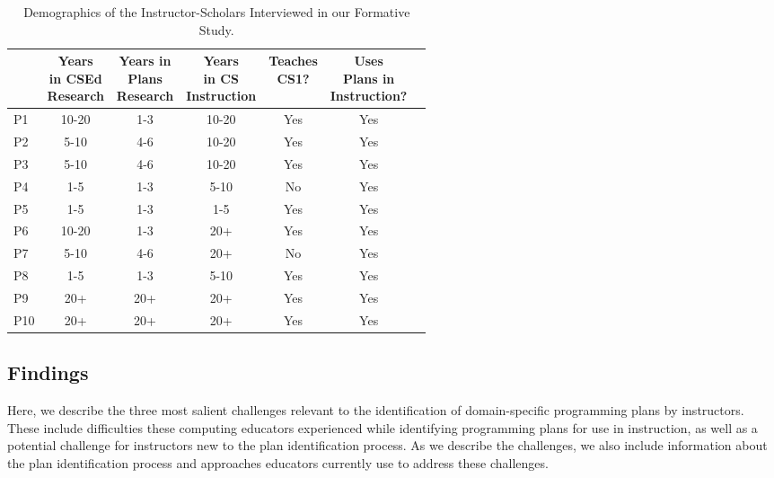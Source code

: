 \begin{table}[h]
\caption{Demographics of the Instructor-Scholars Interviewed in our Formative Study.}
    \centering
    \footnotesize
    \label{tab:formative-participants}
    \begin{tabular}{l|cccccc}
    \toprule
            & \shortstack{Years \\ in CSEd \\ Research} & \shortstack{Years in \\ Plans \\ Research} & \shortstack{Years \\ in CS \\ Instruction} & \shortstack{Teaches \\ CS1?} & \shortstack{Uses \\ Plans in \\ Instruction?}
    \\\midrule
        P1 & 10-20 & 1-3 & 10-20 & Yes  & Yes \\
        P2 & 5-10 & 4-6 & 10-20 & Yes  & Yes \\ 
        P3 & 5-10 & 4-6 & 10-20 & Yes  & Yes \\ 
        P4 & 1-5 & 1-3 & 5-10 & No  & Yes \\ 
        P5 & 1-5 & 1-3 & 1-5 & Yes  & Yes \\ 
        P6 & 10-20 & 1-3 & 20+ & Yes  & Yes \\ 
        P7 & 5-10 & 4-6 & 20+ & No  & Yes \\ 
        P8 & 1-5 & 1-3 & 5-10 & Yes  & Yes \\ 
        P9 & 20+ & 20+ & 20+ & Yes  & Yes \\ 
        P10 & 20+ & 20+ & 20+ & Yes  & Yes \\ 
    \end{tabular}%
\end{table}


\subsection{Findings}
\label{sec:challenges}

Here, we describe the three most salient challenges relevant to the identification of domain-specific programming plans by instructors. These include difficulties these computing educators experienced while identifying programming plans for use in instruction, as well as a potential challenge for instructors new to the plan identification process. As we describe the challenges, we also include information about the plan identification process and approaches educators currently use to address these challenges.

